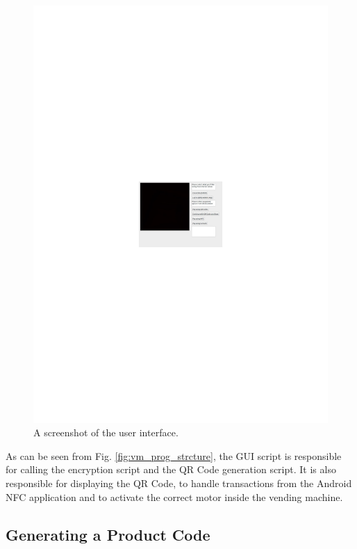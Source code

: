 \begin{figure}
 \centering 
 \includegraphics[clip = true, trim = 190 370 0 350, scale=2]{gui_screenshot}
 \caption{A screenshot of the user interface.}
 \label{fig:gui-screenshot}
\end{figure}

As can be seen from Fig. \ref{fig:vm_prog_strcture}, the GUI script is
responsible for calling the encryption script and the QR Code generation script.
It is also responsible for displaying the QR Code, to handle transactions from
the Android NFC application and to activate the correct motor inside the vending
machine. 

\subsection{Generating a Product Code}


